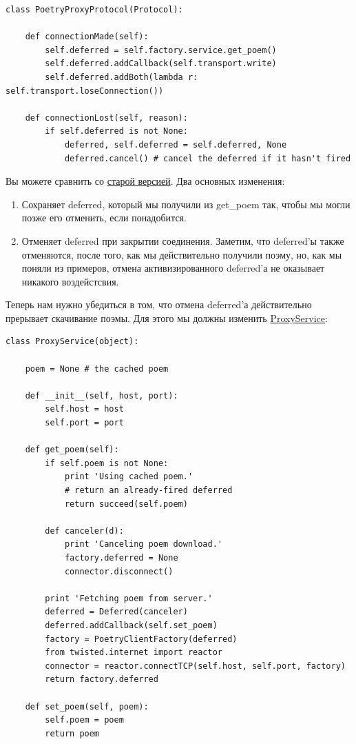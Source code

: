\begin{scriptsize}\begin{verbatim}
class PoetryProxyProtocol(Protocol):

    def connectionMade(self):
        self.deferred = self.factory.service.get_poem()
        self.deferred.addCallback(self.transport.write)
        self.deferred.addBoth(lambda r: self.transport.loseConnection())

    def connectionLost(self, reason):
        if self.deferred is not None:
            deferred, self.deferred = self.deferred, None
            deferred.cancel() # cancel the deferred if it hasn't fired
\end{verbatim}\end{scriptsize} 

Вы можете сравнить со 
\href{http://github.com/jdavisp3/twisted-intro/blob/master/twisted-server-2/poetry-proxy.py#L52}{старой версией}. Два основных изменения:
\begin{enumerate}
\item Сохраняет deferred, который мы получили из get\_poem так, чтобы 
    мы могли позже его отменить, если понадобится.

\item Отменяет deferred при закрытии соединения. Заметим, что 
    deferred'ы также отменяются, после того, как мы действительно получили 
    поэму, но, как мы поняли из примеров, отмена активизированного deferred'а 
    не оказывает никакого воздейстсвия.
\end{enumerate}


Теперь нам нужно убедиться в том, что отмена deferred'а 
действительно прерывает скачивание поэмы. Для этого мы должны 
изменить \href{http://github.com/jdavisp3/twisted-intro/blob/master/twisted-server-4/poetry-proxy.py#L105}{ProxyService}: 

\begin{scriptsize}\begin{verbatim}
class ProxyService(object):

    poem = None # the cached poem

    def __init__(self, host, port):
        self.host = host
        self.port = port

    def get_poem(self):
        if self.poem is not None:
            print 'Using cached poem.'
            # return an already-fired deferred
            return succeed(self.poem)

        def canceler(d):
            print 'Canceling poem download.'
            factory.deferred = None
            connector.disconnect()

        print 'Fetching poem from server.'
        deferred = Deferred(canceler)
        deferred.addCallback(self.set_poem)
        factory = PoetryClientFactory(deferred)
        from twisted.internet import reactor
        connector = reactor.connectTCP(self.host, self.port, factory)
        return factory.deferred

    def set_poem(self, poem):
        self.poem = poem
        return poem
\end{verbatim}\end{scriptsize}

